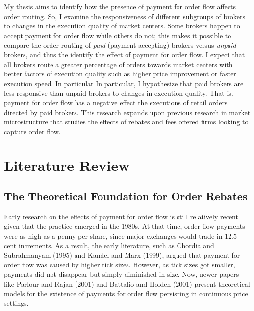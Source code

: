 \documentclass[11pt,a4paper]{article}
\begin{document}
My thesis aims to identify how the presence of payment for order flow affects order routing. 
So, I examine the responsiveness of different subgroups of brokers to changes in the execution quality of market centers. 
Some brokers happen to accept payment for order flow while others do not; this makes it possible to compare the order routing of \textit{paid} (payment-accepting) brokers versus \textit{unpaid} brokers, and thus the identify the effect of payment for order flow. 
I expect that all brokers route a greater percentage of orders towards market centers with better factors of execution quality such as higher price improvement or faster execution speed. In particular
In particular, I hypothesize that paid brokers are less responsive than unpaid brokers to changes in execution quality. That is, payment for order flow has a negative effect the executions of retail orders directed by paid brokers. This research expands upon previous research in market microstructure that studies the effects of rebates and fees offered firms looking to capture order flow.  


\pagebreak	
\section{Literature Review}	

\subsection{The Theoretical Foundation for Order Rebates}

Early research on the effects of payment for order flow is still relatively recent given that the practice emerged in the 1980s. At that time, order flow payments were as high as a penny per share, since major exchanges would trade in $12.5$ cent increments. As a result, the early literature, such as Chordia and Subrahmanyam (1995) and Kandel and Marx (1999), argued that payment for order flow was caused by higher tick sizes. However, as tick sizes got smaller, payments did not disappear but simply diminished in size. Now, newer papers like Parlour and Rajan (2001) and Battalio and Holden (2001) present theoretical models for the existence of payments for order flow persisting in continuous price settings. 
\end{document}

